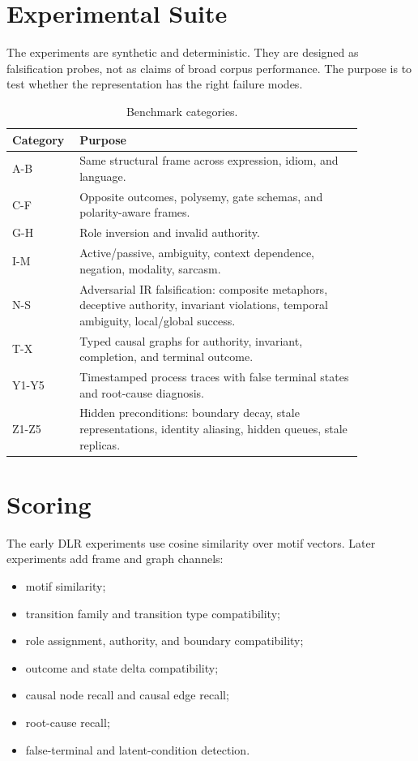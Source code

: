 \documentclass[11pt]{article}
\begin{document}
\section{Experimental Suite}

The experiments are synthetic and deterministic. They are designed as
falsification probes, not as claims of broad corpus performance. The purpose is
to test whether the representation has the right failure modes.

\begin{table}[h]
\centering
\caption{Benchmark categories.}
\small
\begin{tabular}{p{0.12\linewidth}p{0.74\linewidth}}
\toprule
Category & Purpose \\
\midrule
A-B & Same structural frame across expression, idiom, and language. \\
C-F & Opposite outcomes, polysemy, gate schemas, and polarity-aware frames. \\
G-H & Role inversion and invalid authority. \\
I-M & Active/passive, ambiguity, context dependence, negation, modality, sarcasm. \\
N-S & Adversarial IR falsification: composite metaphors, deceptive authority, invariant violations, temporal ambiguity, local/global success. \\
T-X & Typed causal graphs for authority, invariant, completion, and terminal outcome. \\
Y1-Y5 & Timestamped process traces with false terminal states and root-cause diagnosis. \\
Z1-Z5 & Hidden preconditions: boundary decay, stale representations, identity aliasing, hidden queues, stale replicas. \\
\bottomrule
\end{tabular}
\end{table}

\section{Scoring}

The early DLR experiments use cosine similarity over motif vectors. Later
experiments add frame and graph channels:

\begin{itemize}
  \item motif similarity;
  \item transition family and transition type compatibility;
  \item role assignment, authority, and boundary compatibility;
  \item outcome and state delta compatibility;
  \item causal node recall and causal edge recall;
  \item root-cause recall;
  \item false-terminal and latent-condition detection.
\end{itemize}
\end{document}
